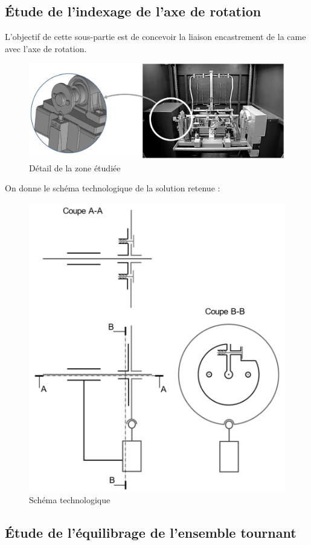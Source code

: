 \subsection{Étude de l’indexage de l’axe de rotation}

L’objectif de cette sous-partie est de concevoir la liaison encastrement de la came avec l’axe de rotation.

\begin{figure}[!h]
\centering\includegraphics[width=0.8\linewidth]{img/fig07}
 \caption{Détail de la zone étudiée}
 \label{img07}
\end{figure}

On donne le schéma technologique de la solution retenue :

\begin{figure}[!h]
\centering\includegraphics[width=0.45\linewidth]{img/fig08}
 \caption{Schéma technologique}
 \label{img08}
\end{figure}



\subsection{Étude de l’équilibrage de l’ensemble tournant}

